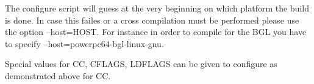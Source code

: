 The configure script will guess at the very beginning on which
platform the build is done. In case this failes or a cross compilation
must be performed please use the option {\ttfamily --host=HOST}. For
instance in order to compile for the BGL you have to specify
{\ttfamily --host=powerpc64-bgl-linux-gnu}.

Special values for {\ttfamily CC, CFLAGS, LDFLAGS} can be given to
configure as demonstrated above for {\ttfamily CC}.


